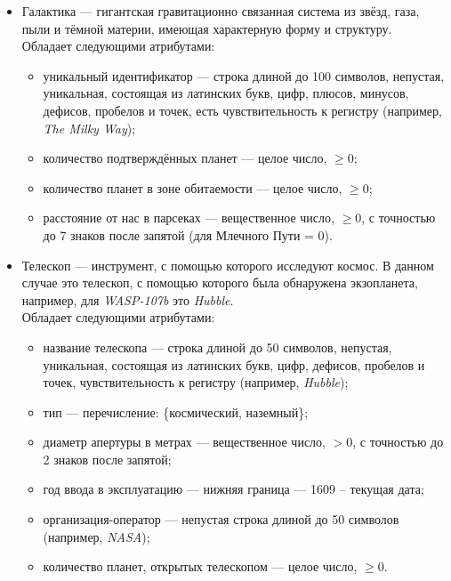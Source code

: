 \documentclass[14pt,a4paper]{extarticle}
\begin{document}
\begin{itemize}
		
		
		
		\item Галактика --- гигантская гравитационно связанная система из звёзд, газа, пыли и тёмной материи, имеющая характерную форму и структуру.\\
		Обладает следующими атрибутами:
		\begin{itemize}
			\item уникальный идентификатор --- строка длиной до 100 символов, непустая, уникальная, состоящая из латинских букв, цифр, плюсов, минусов, дефисов, пробелов и точек, есть чувствительность к регистру (например, \textit{The Milky Way});
			\item количество подтверждённых планет --- целое число, $\geq 0$;
			\item количество планет в зоне обитаемости --- целое число, $\geq 0$;
			\item расстояние от нас в парсеках --- вещественное число, $\geq 0$, с точностью до 7 знаков после запятой (для Млечного Пути = 0).
		\end{itemize}
		
		\item Телескоп --- инструмент, с помощью которого исследуют космос. В данном случае это телескоп, с помощью которого была обнаружена экзопланета, например, для \textit{WASP-107b} это \textit{Hubble}.\\
		Обладает следующими атрибутами:
		\begin{itemize}
			\item название телескопа --- строка длиной до 50 символов, непустая, уникальная, состоящая из латинских букв, цифр, дефисов, пробелов и точек, чувствительность к регистру (например, \textit{Hubble});
			\item тип --- перечисление: \{космический, наземный\};
			\item диаметр апертуры в метрах --- вещественное число, $> 0$, с точностью до 2 знаков после запятой;
			\item год ввода в эксплуатацию --- нижняя граница --- 1609 -- текущая дата;
			\item организация-оператор --- непустая строка длиной до 50 символов (например, \textit{NASA});
			\item количество планет, открытых телескопом --- целое число, $\geq 0$.
		\end{itemize}
		

\end{itemize}
\end{document}
